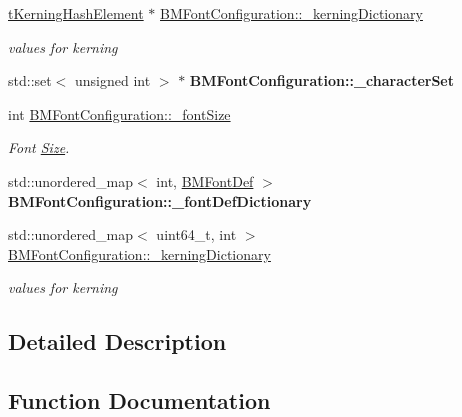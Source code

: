 \begin{DoxyCompactItemize}
\mbox{\label{group__label_ga246c499bd161998ce4382f474e9be832}} 
\hyperlink{struct__KerningHashElement}{t\+Kerning\+Hash\+Element} $\ast$ \hyperlink{group__label_ga246c499bd161998ce4382f474e9be832}{B\+M\+Font\+Configuration\+::\+\_\+kerning\+Dictionary}
\begin{DoxyCompactList}\small\item\em values for kerning \end{DoxyCompactList}\item 
\mbox{\label{group__label_ga072272dc473cfc1a0a6d813f56e8514b}} 
std\+::set$<$ unsigned int $>$ $\ast$ {\bfseries B\+M\+Font\+Configuration\+::\+\_\+character\+Set}
\item 
\mbox{\label{group__label_gacffa3f4764fb2fa613d1276210819c14}} 
int \hyperlink{group__label_gacffa3f4764fb2fa613d1276210819c14}{B\+M\+Font\+Configuration\+::\+\_\+font\+Size}
\begin{DoxyCompactList}\small\item\em Font \hyperlink{classSize}{Size}. \end{DoxyCompactList}\item 
\mbox{\label{group__label_ga1e33b7dd227fb6004c36c06962835963}} 
std\+::unordered\+\_\+map$<$ int, \hyperlink{structBMFontDef}{B\+M\+Font\+Def} $>$ {\bfseries B\+M\+Font\+Configuration\+::\+\_\+font\+Def\+Dictionary}
\item 
\mbox{\label{group__label_gaaf96511ac7124077592700eee5f504d0}} 
std\+::unordered\+\_\+map$<$ uint64\+\_\+t, int $>$ \hyperlink{group__label_gaaf96511ac7124077592700eee5f504d0}{B\+M\+Font\+Configuration\+::\+\_\+kerning\+Dictionary}
\begin{DoxyCompactList}\small\item\em values for kerning \end{DoxyCompactList}\end{DoxyCompactItemize}


\subsection{Detailed Description}


\subsection{Function Documentation}
\mbox{\label{group__label_ga04b6c1a932298f09e2271950f2da6661}} 
